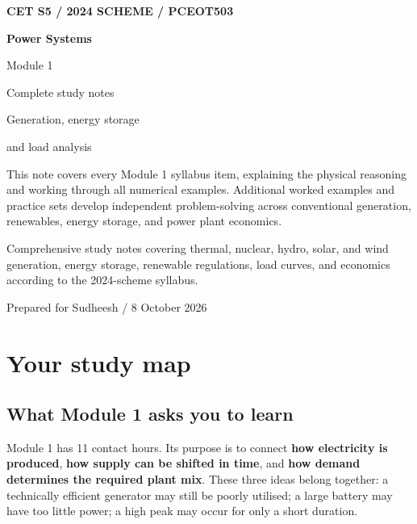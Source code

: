 \documentclass[11pt,a4paper]{article}
\newenvironment{Idea}[1]{\begin{tcolorbox}[colback=pale,colframe=teal,coltitle=white,title={#1}]}{\end{tcolorbox}}
\newcommand{\chapterstart}[2]{\clearpage\section{#1}\label{#2}}
\begin{document}
\begin{titlepage}
\vspace*{12mm}
{\sffamily\small\color{teal}\textbf{CET S5 / 2024 SCHEME / PCEOT503}}\par
\vspace{16mm}
{\sffamily\fontsize{34}{39}\selectfont\bfseries\color{ink}Power Systems\par Module 1}\par
\vspace{7mm}
{\sffamily\LARGE\color{teal}Complete study notes}\par
\vspace{5mm}
{\Large Generation, energy storage\par and load analysis}\par
\vspace{13mm}
\vspace{12mm}
\begin{Idea}{Built for understanding and exam preparation}
This note covers every Module 1 syllabus item, explaining the physical reasoning and working through all numerical examples. Additional worked examples and practice sets develop independent problem-solving across conventional generation, renewables, energy storage, and power plant economics.
\end{Idea}
\vfill
{\small Comprehensive study notes covering thermal, nuclear, hydro, solar, and wind generation, energy storage, renewable regulations, load curves, and economics according to the 2024-scheme syllabus.}\par\vspace{4mm}
{\small\sffamily Prepared for Sudheesh / 8 October 2026}
\end{titlepage}
\tableofcontents
\clearpage{}
\chapterstart{Your study map}{roadmap}
\subsection{What Module 1 asks you to learn}
Module 1 has 11 contact hours. Its purpose is to connect \textbf{how electricity is produced}, \textbf{how supply can be shifted in time}, and \textbf{how demand determines the required plant mix}. These three ideas belong together: a technically efficient generator may still be poorly utilised; a large battery may have too little power; a high peak may occur for only a short duration.
\end{document}
